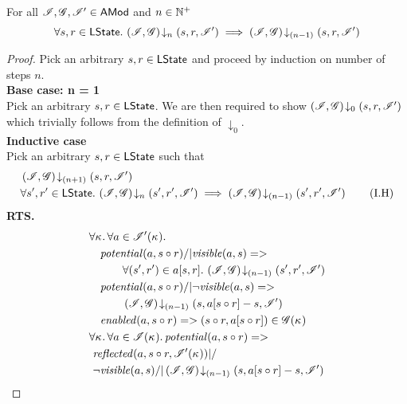 \begin{lemma}[]\label{lem:future-closure}
For all $\mathscr{I}, \mathscr{G}, \mathscr{I}' \in \textsf{AMod}$ and $n \in \mathbb{N}^{+}$
%
\[
	\forall s, r \in \textsf{LState}.\, \left(\mathscr{I}, \mathscr{G}\right) \!\downarrow_{n} \left(s, r, \mathscr{I}'\right) \implies \left(\mathscr{I}, \mathscr{G}\right) \!\downarrow_{(n-1)} \left(s, r, \mathscr{I}'\right)
\]
%
\begin{proof} Pick an arbitrary $s, r \in \textsf{LState}$ and proceed by induction on number of steps $n$.\\

\noindent\textbf{Base case: n = 1}\\
Pick an arbitrary $s, r \in \textsf{LState}$. We are then required to show $\left(\mathscr{I}, \mathscr{G}\right) \!\downarrow_{0} \left(s, r, \mathscr{I}'\right)$ which trivially follows from the definition of $\downarrow_0$.\\

\noindent\textbf{Inductive case}\\
Pick an arbitrary $s, r \in \textsf{LState}$ such that
%
\begin{align}
	& \left(\mathscr{I}, \mathscr{G}\right) \!\downarrow_{(n+1)} \left(s, r, \mathscr{I}'\right) \label{FCL:Ass1}\\
	& \forall s', r' \in \textsf{LState}.\, \left(\mathscr{I}, \mathscr{G}\right) \!\downarrow_{n} \left(s', r', \mathscr{I}'\right) \implies \left(\mathscr{I}, \mathscr{G}\right) \!\downarrow_{(n-1)} \left(s', r', \mathscr{I}'\right) \tag{I.H} \label{FCL:IH}
\end{align}
%
\textbf{RTS. }
%
\begin{align}
	& 
	\V{\ca{}}  \V{a\in \lmod'(\ca{})} \nonumber \\
  &\quad \m{potential}(a, s \composeL r) /| \m{visible}(a, s) => \nonumber\\
  & \quad\qquad\for{(s', r') \in a[s, r]} \extendsAMUpto{\lmod, \gmod}{(n-1)}{s'}{r'}{\lmod'} \label{FCL:Goal0}\\
% 
	&\quad \m{potential}(a, s \composeL r) /| \neg\m{visible}(a, s) => \nonumber\\
  & \quad\qquad \extendsAMUpto{\lmod, \gmod}{(n-1)}{s}{a[s \composeL r] - s}{\lmod'} \label{FCL:Goal1}\\
%   
  &\quad \m{enabled}(a,s \composeL r)
  => (s \composeL r, a[s \composeL r])\in \gmod(\ca{}) \label{FCL:Goal2}\\
%  
  &\V{\ca{}}\V{a\in \lmod(\ca{})}
  \m{potential}(a,s \composeL r) =>\null \nonumber \\
  &\ \m{reflected}(a, s \composeL r,\lmod'(\ca{})) |/\null \nonumber \\
%  
  &\ \neg\m{visible}(a, s) /| \extendsAMUpto{\lmod, \gmod}{(n-1)}{s}{a[s \composeL r] - s}{\lmod'}  \label{FCL:Goal3}
\end{align}

\end{proof}
\end{lemma}
